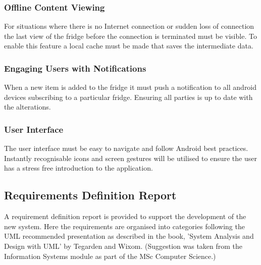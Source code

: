 \documentclass[a4paper, 11pt]{article}
\begin{document}
\subsubsection{Offline Content Viewing}
For situations where there is no Internet connection or sudden loss of connection the last view of the fridge before the connection is terminated must be visible. To enable this feature a local cache must be made that saves the intermediate data.

\subsubsection{Engaging Users with Notifications}
When a new item is added to the fridge it must push a notification to all android devices subscribing to a particular fridge.  Ensuring all parties is up to date with the alterations. 

\subsubsection{User Interface}
The user interface must be easy to navigate and follow Android best practices. Instantly recognisable icons and screen gestures will be utilised to ensure the user has a stress free introduction to the application.

\subsection{Requirements Definition Report}
A requirement definition report is provided to support the development of the new system. Here the requirements are organised into categories following the UML recommended presentation as described in the book, 'System Analysis and Design with UML' by Tegarden and Wixom. (Suggestion was taken from the Information Systems module as part of the MSc Computer Science.)
\end{document}
